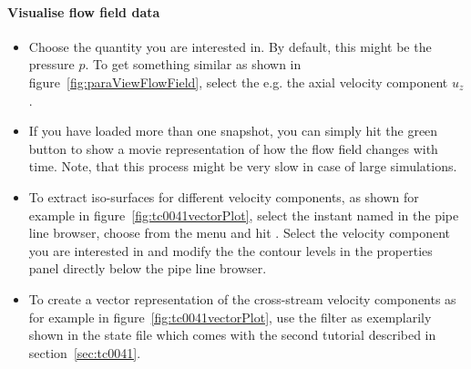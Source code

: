 \documentclass[a4paper, 11pt, DIV=11]{scrartcl}
\begin{document}
\paragraph{Visualise flow field data}
\begin{itemize}
\item
Choose the quantity you are interested in. By default, this
might be the pressure $p$. To get something similar as shown
in figure~\ref{fig:paraViewFlowField}, select the e.g. the
axial velocity component $u_z$.
\item
If you have loaded more than one snapshot, you can simply hit
the green  button to show a movie representation of
how the flow field changes with time. Note, that this process
might be very slow in case of large simulations.
\item
To extract iso-surfaces for different velocity components, as
shown for example in figure~\ref{fig:tc0041vectorPlot}, select
the instant named  in the pipe
line browser, choose  from the menu and hit . Select the velocity
component you are interested in and modify the the contour levels
in the properties panel directly below the pipe line browser.
\item
To create a vector representation of the cross-stream velocity
components as for example in figure~\ref{fig:tc0041vectorPlot},
use the  filter as exemplarily shown in the \paraview
state file  which comes with the second
tutorial described in section~\ref{sec:tc0041}.
\end{itemize}
\end{document}
